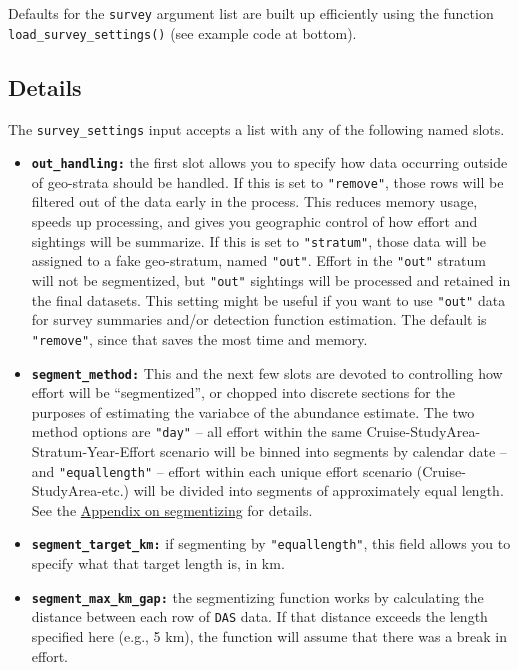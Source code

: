 \documentclass[
]{book}
\begin{document}
Defaults for the \texttt{survey} argument list are built up efficiently using the function \texttt{load\_survey\_settings()} (see example code at bottom).

\hypertarget{details}{%
\subsection*{Details}\label{details}}

The \texttt{survey\_settings} input accepts a list with any of the following named slots.

\begin{itemize}
\item
  \textbf{\texttt{out\_handling:}} the first slot allows you to specify how data occurring outside of geo-strata should be handled. If this is set to \texttt{"remove"}, those rows will be filtered out of the data early in the process. This reduces memory usage, speeds up processing, and gives you geographic control of how effort and sightings will be summarize. If this is set to \texttt{"stratum"}, those data will be assigned to a fake geo-stratum, named \texttt{"out"}. Effort in the \texttt{"out"} stratum will not be segmentized, but \texttt{"out"} sightings will be processed and retained in the final datasets. This setting might be useful if you want to use \texttt{"out"} data for survey summaries and/or detection function estimation. The default is \texttt{"remove"}, since that saves the most time and memory.
\item
  \textbf{\texttt{segment\_method:}} This and the next few slots are devoted to controlling how effort will be ``segmentized'', or chopped into discrete sections for the purposes of estimating the variabce of the abundance estimate. The two method options are \texttt{"day"} -- all effort within the same Cruise-StudyArea-Stratum-Year-Effort scenario will be binned into segments by calendar date -- and \texttt{"equallength"} -- effort within each unique effort scenario (Cruise-StudyArea-etc.) will be divided into segments of approximately equal length. See the \protect\hyperlink{segmentizing}{Appendix on segmentizing} for details.
\item
  \textbf{\texttt{segment\_target\_km:}} if segmenting by \texttt{"equallength"}, this field allows you to specify what that target length is, in km.
\item
  \textbf{\texttt{segment\_max\_km\_gap:}} the segmentizing function works by calculating the distance between each row of \texttt{DAS} data. If that distance exceeds the length specified here (e.g., 5 km), the function will assume that there was a break in effort.

\end{itemize}
\end{document}
